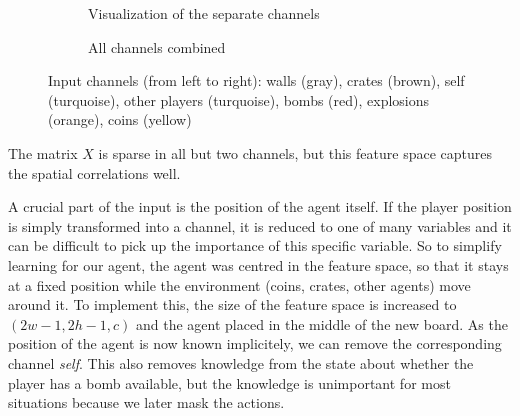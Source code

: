 \begin{figure}
  \centering
  \begin{subfigure}[b]{0.6\textwidth}
    \centering
    \usebox{\largestimage}
    \caption{Visualization of the separate channels}
  \end{subfigure}
  \quad
  \begin{subfigure}[b]{0.36\textwidth}
    \centering
    \caption{All channels combined}
  \end{subfigure}
  \caption{Input channels (from left to right): walls (gray), crates (brown), self (turquoise), other players (turquoise), bombs (red), explosions (orange), coins (yellow)}
  \label{fig:input-channels}
\end{figure}

The matrix $X$ is sparse in all but two channels, but this feature space captures the spatial correlations well.

A crucial part of the input is the position of the agent itself. If the player position is simply transformed into a channel, it is reduced to one of many variables and it can be difficult to pick up the importance of this specific variable. So to simplify learning for our agent, the agent was centred in the feature space, so that it stays at a fixed position while the environment (coins, crates, other agents) move around it. To implement this, the size of the feature space is increased to $(2w-1, 2h-1, c)$ and the agent placed in the middle of the new board. As the position of the agent is now known implicitely, we can remove the corresponding channel \emph{self}. This also removes knowledge from the state about whether the player has a bomb available, but the knowledge is unimportant for most situations because we later mask the actions.

